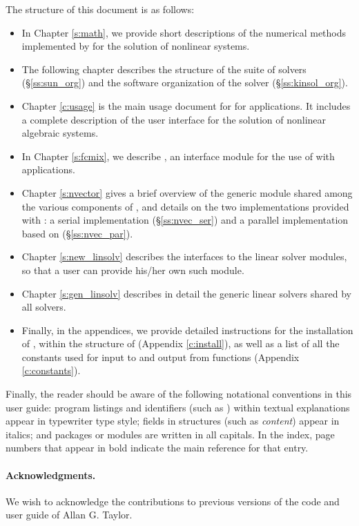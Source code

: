 The structure of this document is as follows:
\begin{itemize}
\item
  In Chapter \ref{s:math}, we provide short descriptions of the numerical
  methods implemented by {\kinsol} for the solution of nonlinear systems.
\item
  The following chapter describes the structure of the {\sundials} suite
  of solvers (\S\ref{ss:sun_org}) and the software organization of the {\kinsol}
  solver (\S\ref{ss:kinsol_org}).
\item
  Chapter \ref{c:usage} is the main usage document for {\kinsol} for {\C} applications.
  It includes a complete description of the user interface for the solution
  of nonlinear algebraic systems.
\item
  In Chapter \ref{s:fcmix}, we describe {\fkinsol}, an interface module for the
  use of {\kinsol} with {\F} applications.
\item
  Chapter \ref{s:nvector} gives a brief overview of the generic {\nvector} module
  shared among the various components of {\sundials}, and details on the two
  {\nvector} implementations provided with {\sundials}: a serial implementation
  (\S\ref{ss:nvec_ser}) and a parallel implementation based on {\mpi} 
  (\S\ref{ss:nvec_par}).
\item
  Chapter \ref{s:new_linsolv} describes the interfaces to the linear solver
  modules, so that a user can provide his/her own such module.
\item
  Chapter \ref{s:gen_linsolv} describes in detail the generic linear solvers
  shared by all {\sundials} solvers.
\item
  Finally, in the appendices, we provide detailed instructions for the installation
  of {\kinsol}, within the structure of {\sundials} (Appendix \ref{c:install}), as well
  as a list of all the constants used for input to and output from {\kinsol} functions
  (Appendix \ref{c:constants}).
\end{itemize}

Finally, the reader should be aware of the following notational
conventions in this user guide:  program listings and identifiers
(such as ) within textual explanations appear in
typewriter type style; fields in {\C} structures (such as {\em
content}) appear in italics; and packages or modules are written
in all capitals. In the index, page numbers that appear in bold
indicate the main reference for that entry.

\paragraph{Acknowledgments.}
We wish to acknowledge the contributions to previous versions of the
{\kinsol} code and user guide of Allan G. Taylor.
